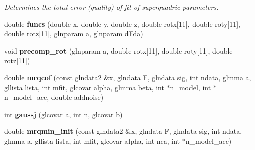 \begin{DoxyCompactItemize}
\begin{DoxyCompactList}\small\item\em Determines the total error (quality) of fit of superquadric parameters. \end{DoxyCompactList}\item 
\hypertarget{namespaceope_a0d08e8b4661611bab654c2d70539a73d}{double {\bfseries funcs} (double x, double y, double z, double rotx\mbox{[}11\mbox{]}, double roty\mbox{[}11\mbox{]}, double rotz\mbox{[}11\mbox{]}, glnparam a, glnparam d\-Fda)}\label{namespaceope_a0d08e8b4661611bab654c2d70539a73d}

\item 
\hypertarget{namespaceope_a81c36593bff205bd08d55a7bae952c84}{void {\bfseries precomp\-\_\-rot} (glnparam a, double rotx\mbox{[}11\mbox{]}, double roty\mbox{[}11\mbox{]}, double rotz\mbox{[}11\mbox{]})}\label{namespaceope_a81c36593bff205bd08d55a7bae952c84}

\item 
\hypertarget{namespaceope_afc5e4797a3d9663bdd147862cf5414b8}{double {\bfseries mrqcof} (const glndata2 \&x, glndata F, glndata sig, int ndata, glmma a, gllista lista, int mfit, glcovar alpha, glmma beta, int $\ast$n\-\_\-model, int $\ast$n\-\_\-model\-\_\-acc, double addnoise)}\label{namespaceope_afc5e4797a3d9663bdd147862cf5414b8}

\item 
\hypertarget{namespaceope_a059aaa453007c4d21e412ce5afd2890a}{int {\bfseries gaussj} (glcovar a, int n, glcovar b)}\label{namespaceope_a059aaa453007c4d21e412ce5afd2890a}

\item 
\hypertarget{namespaceope_a607d67f7431ed639c8c5702fa004ab36}{double {\bfseries mrqmin\-\_\-init} (const glndata2 \&x, glndata F, glndata sig, int ndata, glmma a, gllista lista, int mfit, glcovar alpha, int nca, int $\ast$n\-\_\-model\-\_\-acc)}\label{namespaceope_a607d67f7431ed639c8c5702fa004ab36}


\end{DoxyCompactItemize}

